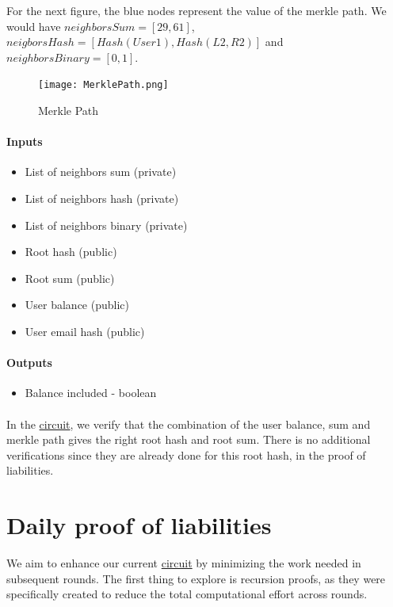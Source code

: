 For the next figure, the blue nodes represent the value of the merkle path.
We would have $neighborsSum=[29,61]$, $neigborsHash=[Hash(User1),Hash(L2,R2)]$ and $neighborsBinary=[0,1]$.
\begin{figure}[H]
   \centering
   \texttt{[image: MerklePath.png]}
   \caption{Merkle Path}
   \label{overflow}
   \end{figure}


\paragraph{Inputs}
\begin{itemize}
   \item List of neighbors sum (private)
   \item List of neighbors hash (private)
   \item List of neighbors binary (private)
   \item Root hash (public)
   \item Root sum (public)
   \item User balance (public)
   \item User email hash (public)
   \end{itemize}


\paragraph{Outputs}
\begin{itemize}
   \item Balance included - boolean
   \end{itemize}

\paragraph{}
In the \hyperref[subsec:pic]{circuit}, we verify that the combination of the user balance, sum and merkle path gives the right root hash and root sum. There is no additional
verifications since they are already done for this root hash, in the proof of liabilities.

\section{Daily proof of liabilities}
We aim to enhance our current \hyperref[subsec:pl]{circuit} by minimizing the work needed in subsequent rounds.
The first thing to explore is recursion proofs, as they were specifically created to reduce the total computational effort across rounds.

